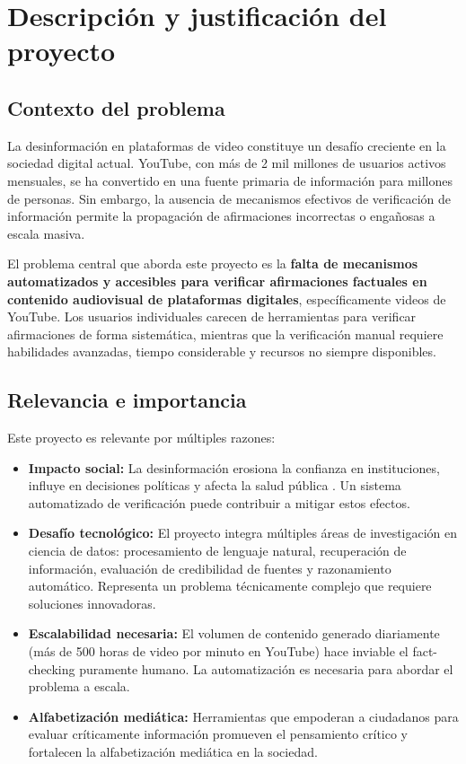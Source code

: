 \documentclass[12pt,a4paper]{article}
\begin{document}
\section{Descripción y justificación del proyecto}

\subsection{Contexto del problema}

La desinformación en plataformas de video constituye un desafío creciente en la sociedad digital actual. YouTube, con más de 2 mil millones de usuarios activos mensuales, se ha convertido en una fuente primaria de información para millones de personas. Sin embargo, la ausencia de mecanismos efectivos de verificación de información permite la propagación de afirmaciones incorrectas o engañosas a escala masiva.

El problema central que aborda este proyecto es la \textbf{falta de mecanismos automatizados y accesibles para verificar afirmaciones factuales en contenido audiovisual de plataformas digitales}, específicamente videos de YouTube. Los usuarios individuales carecen de herramientas para verificar afirmaciones de forma sistemática, mientras que la verificación manual requiere habilidades avanzadas, tiempo considerable y recursos no siempre disponibles.

\subsection{Relevancia e importancia}

Este proyecto es relevante por múltiples razones:

\begin{itemize}
    \item \textbf{Impacto social:} La desinformación erosiona la confianza en instituciones, influye en decisiones políticas y afecta la salud pública \citep{wardle2017information, benkler2018network}. Un sistema automatizado de verificación puede contribuir a mitigar estos efectos.

    \item \textbf{Desafío tecnológico:} El proyecto integra múltiples áreas de investigación en ciencia de datos: procesamiento de lenguaje natural, recuperación de información, evaluación de credibilidad de fuentes y razonamiento automático. Representa un problema técnicamente complejo que requiere soluciones innovadoras.

    \item \textbf{Escalabilidad necesaria:} El volumen de contenido generado diariamente (más de 500 horas de video por minuto en YouTube) hace inviable el fact-checking puramente humano. La automatización es necesaria para abordar el problema a escala.

    \item \textbf{Alfabetización mediática:} Herramientas que empoderan a ciudadanos para evaluar críticamente información promueven el pensamiento crítico y fortalecen la alfabetización mediática en la sociedad.
\end{itemize}
\end{document}
